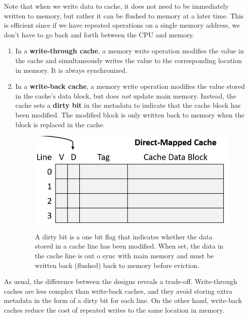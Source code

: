 \documentclass{article}
\begin{document}
      \begin{definition}
        Note that when we write data to cache, it does not need to be immediately written to memory, but rather it can be flushed to memory at a later time. This is efficient since if we have repeated operations on a single memory address, we don't have to go back and forth between the CPU and memory. 
        \begin{enumerate}
          \item In a \textbf{write-through cache}, a memory write operation modifies the value in the cache and simultaneously writes the value to the corresponding location in memory. It is always synchronized. 
          \item In a \textbf{write-back cache}, a memory write operation modifies the value stored in the cache's data block, but does \textit{not} update main memory. Instead, the cache sets a \textbf{dirty bit} in the metadata to indicate that the cache block has been modified. The modified block is only written back to memory when the block is replaced in the cache. 

          \begin{figure}[H]
            \centering 
            \includegraphics[scale=0.4]{img/dirty_bit.png}
            \caption{A dirty bit is a one bit flag that indicates whether the data stored in a cache line has been modified. When set, the data in the cache line is out o sync with main memory and must be written back (flushed) back to memory before eviction. } 
            \label{fig:dirty_bit}
          \end{figure}
        \end{enumerate}
        As usual, the difference between the designs reveals a trade-off. Write-through caches are less complex than write-back caches, and they avoid storing extra metadata in the form of a dirty bit for each line. On the other hand, write-back caches reduce the cost of repeated writes to the same location in memory.
      \end{definition}
\end{document}
